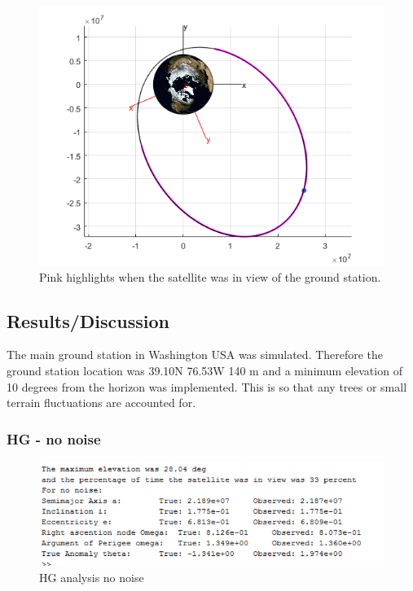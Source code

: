 \documentclass[Space3_Assign1.tex]{subfiles}
\begin{document}
\begin{figure}[h!]
\centering
\includegraphics[width=0.7\linewidth]{Q3_sim_top}
\caption{Pink highlights when the satellite was in view of the ground station.}
\label{fig:Q3_sim_top}
\end{figure}

\subsection{Results/Discussion}
The main ground station in Washington USA was simulated. Therefore the ground station location was 39.10N 76.53W 140 m and a minimum elevation of 10 degrees from the horizon was implemented. This is so that any trees or small terrain fluctuations are accounted for.





\subsubsection{HG - no noise}
\begin{figure}[h!]
\centering
\includegraphics[width=1\linewidth]{nonoise}
\caption{HG analysis no noise}
\label{fig:nonoise}
\end{figure}
\end{document}
